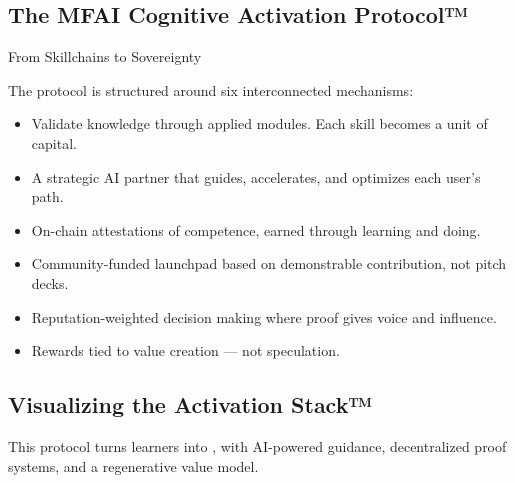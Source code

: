 \vspace{2em}

\subsection*{The MFAI Cognitive Activation Protocol™}

\begin{mfai-phase}{From Skillchains to Sovereignty}

The protocol is structured around six interconnected mechanisms:

\begin{itemize}
  \item {} Validate knowledge through applied modules. Each skill becomes a unit of capital.
  \item {} A strategic AI partner that guides, accelerates, and optimizes each user’s path.
  \item {} On-chain attestations of competence, earned through learning and doing.
  \item {} Community-funded launchpad based on demonstrable contribution, not pitch decks.
  \item {} Reputation-weighted decision making where proof gives voice and influence.
  \item {} Rewards tied to value creation — not speculation.
\end{itemize}

\end{mfai-phase}

\vspace{2em}

\subsection*{Visualizing the Activation Stack™}

\begin{center}
\end{center}

\vspace{1em}

\begin{mfai-note}
This protocol turns learners into , with AI-powered guidance, decentralized proof systems, and a regenerative value model.
\end{mfai-note}
